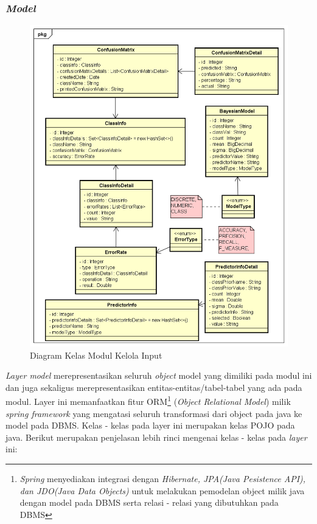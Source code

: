 \subsubsection{\textit{Model}}
\begin{figure}[H]
	\centering
	\includegraphics[scale=0.6]{ClassDiagramLengkap/Klasifikasi/Simple_CD_Klasifikasi_Model}
	\caption[Diagram Kelas Modul Kelola Input]{Diagram Kelas Modul Kelola Input}
	\label{fig:Diagram Kelas Modul Kelola Input}
\end{figure}

\textit{Layer model} merepresentasikan seluruh \textit{object} model yang dimiliki pada modul ini dan juga sekaligus merepresentasikan entitas-entitas/tabel-tabel yang ada pada modul. Layer ini memanfaatkan fitur ORM\footnote{\textit{Spring} menyediakan integrasi dengan \textit{Hibernate, JPA(Java Pesistence API), dan JDO(Java Data Objects)} untuk melakukan pemodelan object milik java dengan model pada DBMS serta relasi - relasi yang dibutuhkan pada DBMS} (\textit{Object Relational Model}) milik \textit{spring framework} yang mengatasi seluruh transformasi dari object pada java ke model pada DBMS. Kelas - kelas pada layer ini merupakan kelas POJO pada java. Berikut merupakan penjelasan lebih rinci mengenai kelas - kelas pada \textit{layer} ini:

